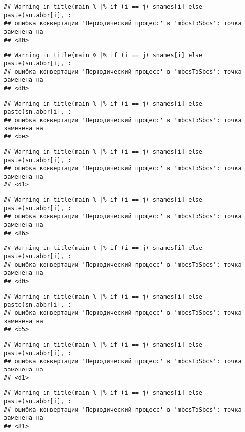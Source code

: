 \documentclass[
]{article}
\begin{document}
\begin{verbatim}
## Warning in title(main %||% if (i == j) snames[i] else paste(sn.abbr[i], :
## ошибка конвертации 'Периодический процесс' в 'mbcsToSbcs': точка заменена на
## <80>
\end{verbatim}

\begin{verbatim}
## Warning in title(main %||% if (i == j) snames[i] else paste(sn.abbr[i], :
## ошибка конвертации 'Периодический процесс' в 'mbcsToSbcs': точка заменена на
## <d0>
\end{verbatim}

\begin{verbatim}
## Warning in title(main %||% if (i == j) snames[i] else paste(sn.abbr[i], :
## ошибка конвертации 'Периодический процесс' в 'mbcsToSbcs': точка заменена на
## <be>
\end{verbatim}

\begin{verbatim}
## Warning in title(main %||% if (i == j) snames[i] else paste(sn.abbr[i], :
## ошибка конвертации 'Периодический процесс' в 'mbcsToSbcs': точка заменена на
## <d1>
\end{verbatim}

\begin{verbatim}
## Warning in title(main %||% if (i == j) snames[i] else paste(sn.abbr[i], :
## ошибка конвертации 'Периодический процесс' в 'mbcsToSbcs': точка заменена на
## <86>
\end{verbatim}

\begin{verbatim}
## Warning in title(main %||% if (i == j) snames[i] else paste(sn.abbr[i], :
## ошибка конвертации 'Периодический процесс' в 'mbcsToSbcs': точка заменена на
## <d0>
\end{verbatim}

\begin{verbatim}
## Warning in title(main %||% if (i == j) snames[i] else paste(sn.abbr[i], :
## ошибка конвертации 'Периодический процесс' в 'mbcsToSbcs': точка заменена на
## <b5>
\end{verbatim}

\begin{verbatim}
## Warning in title(main %||% if (i == j) snames[i] else paste(sn.abbr[i], :
## ошибка конвертации 'Периодический процесс' в 'mbcsToSbcs': точка заменена на
## <d1>
\end{verbatim}

\begin{verbatim}
## Warning in title(main %||% if (i == j) snames[i] else paste(sn.abbr[i], :
## ошибка конвертации 'Периодический процесс' в 'mbcsToSbcs': точка заменена на
## <81>
\end{verbatim}
\end{document}
